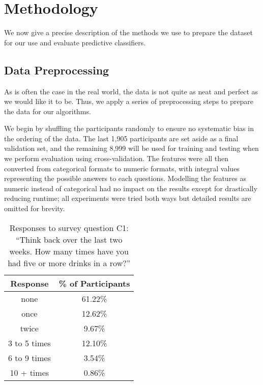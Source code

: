 \section{Methodology}
\label{sec:methods}

We now give a precise description of the methods we use to prepare the dataset for our use and evaluate predictive classifiers.

\subsection{Data Preprocessing}

As is often the case in the real world, the data is not quite as neat and perfect as we would like it to be.  Thus, we apply a series of preprocessing steps to prepare the data for our algorithms.

We begin by shuffling the participants randomly to ensure no systematic bias in the ordering of the data.  The last 1,905 participants are set aside as a final validation set, and the remaining 8,999 will be used for training and testing when we perform evaluation using cross-validation.  The features were all then converted from categorical formats to numeric formats, with integral values representing the possible answers to each questions. Modelling the features as numeric instead of categorical had no impact on the results except for drastically reducing runtime; all experiments were tried both ways but detailed results are omitted for brevity.

\begin{table}[t]
\centering
\begin{tabular}{|c|c|}
\hline
Response & \% of Participants \\ \hline
none & 61.22\% \\ \hline
once & 12.62\% \\ \hline
twice & 9.67\% \\ \hline
3 to 5 times & 12.10\% \\ \hline
6 to 9 times & 3.54\% \\ \hline
10 + times & 0.86\% \\ \hline
\end{tabular}
\caption{Responses to survey question C1: ``Think back over the last two weeks. How many times have you had five or more drinks in a row?''}
\label{C1}
\end{table}

